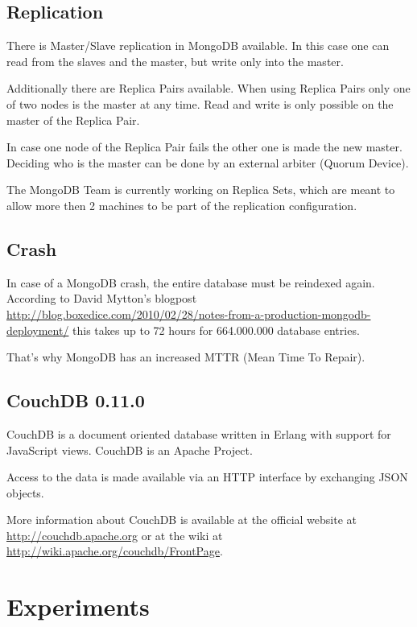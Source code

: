 \documentclass{llncs}
\begin{document}
\subsection{Replication}

There is Master/Slave replication in MongoDB available. In this
case one can read from the slaves and the master, but write only
into the master.

Additionally there are Replica Pairs available. When using Replica
Pairs only one of two nodes is the master at any time. Read and
write is only possible on the master of the Replica Pair.

In case one node of the Replica Pair fails the other one is made
the new master. Deciding who is the master can be done by an
external arbiter (Quorum Device).

The MongoDB Team is currently working on Replica Sets, which are
meant to allow more then 2 machines to be part of the replication
configuration.

\subsection{Crash}

In case of a MongoDB crash, the entire database must be reindexed
again. According to David Mytton's blogpost
\url{http://blog.boxedice.com/2010/02/28/notes-from-a-production-mongodb-deployment/}
this takes up to 72 hours for 664.000.000 database entries.

That's why MongoDB has an increased MTTR (Mean Time To Repair).

\subsection{CouchDB 0.11.0}

CouchDB is a document oriented database written in Erlang with
support for JavaScript views. CouchDB is an Apache Project.

Access to the data is made available via an HTTP interface by
exchanging JSON objects.

More information about CouchDB is available at the official website
at \url{http://couchdb.apache.org} or at the wiki at
\url{http://wiki.apache.org/couchdb/FrontPage}.

\section{Experiments}
\end{document}
